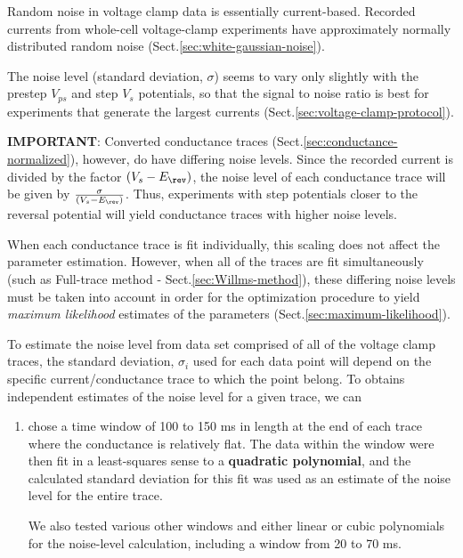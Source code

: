 Random noise in voltage clamp data is essentially current-based. Recorded
currents from whole-cell voltage-clamp experiments have approximately normally
distributed random noise (Sect.\ref{sec:white-gaussian-noise}).

The noise level (standard deviation, $\sigma$) seems to vary only slightly with
the prestep $V_{ps}$ and step $V_s$ potentials, so that the signal to noise
ratio is best for experiments that generate the largest currents
(Sect.\ref{sec:voltage-clamp-protocol}).


{\bf IMPORTANT}: Converted conductance traces
(Sect.\ref{sec:conductance-normalized}), however, do have differing noise
levels. Since the recorded current is divided by the factor $(V_s - E_\rev)$,
the noise level of each conductance trace will be given by $\frac{\sigma}{(V_s -
E_\rev)}$. Thus, experiments with step potentials closer to the reversal
potential will yield conductance traces with higher noise levels.

When each conductance trace is fit individually, this scaling does not affect
the parameter estimation. However, when all of the traces are fit simultaneously
(such as Full-trace method - Sect.\ref{sec:Willms-method}), these differing
noise levels must be taken into account in order for the optimization procedure
to yield {\it maximum likelihood} estimates of the parameters
(Sect.\ref{sec:maximum-likelihood}).

To estimate the noise level from data set comprised of all of the voltage clamp
traces, the standard deviation, $\sigma_i$ used for each data point will depend
on the specific current/conductance trace to which the point belong. To obtains
independent estimates of the noise level for a given trace, we can
\begin{enumerate}
  \item chose a time window of 100 to 150 ms in length at the end of each trace
  where the conductance is relatively flat. The data within the window were then
  fit in a least-squares sense to a {\bf quadratic polynomial}, and the
  calculated standard deviation for this fit was used as an estimate of the noise level for
  the entire trace.

We also tested various other windows and either linear or cubic polynomials for
the noise-level calculation, including a window from 20 to 70 ms.


\end{enumerate}


